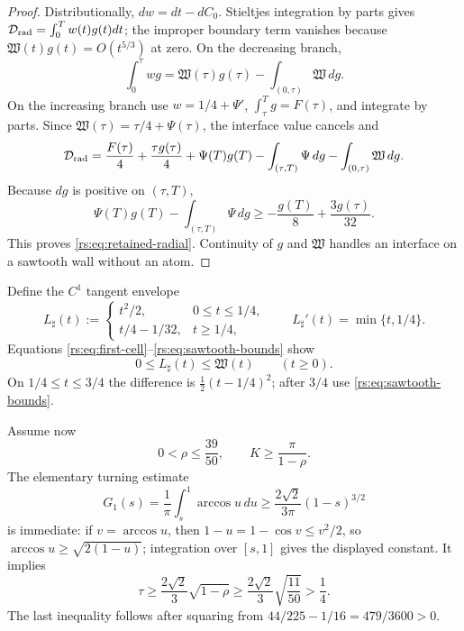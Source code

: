 \documentclass[11pt]{article}
\theoremstyle{remark}
\begin{document}
\begin{proof}
Distributionally, $dw=dt-dC_0$.  Stieltjes integration by parts gives
$\mathcal D_{\rm rad}=\int_0^Tw(t)g(t)dt$; the improper boundary term
vanishes because $\mathfrak W(t)g(t)=O(t^{5/3})$ at zero.  On the
decreasing branch,
\[
 \int_0^\tau wg
 =\mathfrak W(\tau)g(\tau)
  -\int_{(0,\tau)}\mathfrak W\,dg.
\]
On the increasing branch use $w=1/4+\Psi'$,
$\int_\tau^Tg=F(\tau)$, and integrate by parts.  Since
$\mathfrak W(\tau)=\tau/4+\Psi(\tau)$, the interface value cancels and
\[
 \mathcal D_{\rm rad}
 =\frac{F(\tau)}4+\frac{\tau g(\tau)}4
  +\Psi(T)g(T)-\int_{(\tau,T)}\Psi\,dg
  -\int_{(0,\tau)}\mathfrak W\,dg.
\]
Because $dg$ is positive on $(\tau,T)$,
\[
 \Psi(T)g(T)-\int_{(\tau,T)}\Psi\,dg
 \geq-\frac{g(T)}8+\frac{3g(\tau)}{32}.
\]
This proves \eqref{rs:eq:retained-radial}.  Continuity of $g$ and
$\mathfrak W$ handles an interface on a sawtooth wall without an atom.
\end{proof}

Define the $C^1$ tangent envelope
\begin{equation}
 L_\sharp(t):=
 \begin{cases}
 t^2/2,&0\leq t\leq1/4,\\[2pt]
 t/4-1/32,&t\geq1/4,
 \end{cases}
 \qquad
 L_\sharp'(t)=\min\{t,1/4\}.
 \label{rs:eq:L-sharp}
\end{equation}
Equations \eqref{rs:eq:first-cell}--\eqref{rs:eq:sawtooth-bounds} show
\begin{equation}
 0\leq L_\sharp(t)\leq\mathfrak W(t)
 \qquad(t\geq0).
 \label{rs:eq:L-order}
\end{equation}
On $1/4\leq t\leq3/4$ the difference is
$\tfrac12(t-1/4)^2$; after $3/4$ use
\eqref{rs:eq:sawtooth-bounds}.

Assume now
\begin{equation}
 0<\rho\leq\frac{39}{50},
 \qquad K\geq\frac\pi{1-\rho}.
 \label{rs:eq:global-domain}
\end{equation}
The elementary turning estimate
\begin{equation}
 G_1(s)=\frac1\pi\int_s^1\arccos u\,du
 \geq\frac{2\sqrt2}{3\pi}(1-s)^{3/2}
 \label{rs:eq:G-turning}
\end{equation}
is immediate: if $v=\arccos u$, then
$1-u=1-\cos v\leq v^2/2$, so
$\arccos u\geq\sqrt{2(1-u)}$; integration over $[s,1]$ gives the displayed
constant.
It implies
\[
 \tau\geq\frac{2\sqrt2}{3}\sqrt{1-\rho}
 \geq\frac{2\sqrt2}{3}\sqrt{\frac{11}{50}}>\frac14.
\]
The last inequality follows after squaring from
$44/225-1/16=479/3600>0$.
\end{document}
